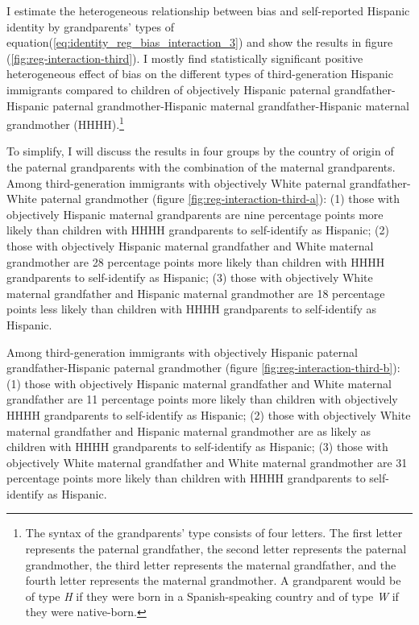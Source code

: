 \documentclass[12pt, fullpage]{article}
\begin{document}
I estimate the heterogeneous relationship between bias and self-reported Hispanic identity by grandparents' types of equation(\ref{eq:identity_reg_bias_interaction_3}) and show the results in figure (\ref{fig:reg-interaction-third}). I mostly find statistically significant positive heterogeneous effect of bias on the different types of third-generation Hispanic immigrants compared to children of objectively Hispanic paternal grandfather-Hispanic paternal grandmother-Hispanic maternal grandfather-Hispanic maternal grandmother (HHHH).\footnote{The syntax of the grandparents' type consists of four letters. The first letter represents the paternal grandfather, the second letter represents the paternal grandmother, the third letter represents the maternal grandfather, and the fourth letter represents the maternal grandmother. A grandparent would be of type \textit{H} if they were born in a Spanish-speaking country and of type \textit{W} if they were native-born.} 

To simplify, I will discuss the results in four groups by the country of origin of the paternal grandparents with the combination of the maternal grandparents. Among third-generation immigrants with objectively White paternal grandfather-White paternal grandmother (figure \ref{fig:reg-interaction-third-a}): (1) those with objectively Hispanic maternal grandparents are nine percentage points more likely than children with HHHH grandparents to self-identify as Hispanic; (2) those with objectively Hispanic maternal grandfather and White maternal grandmother are 28 percentage points more likely than children with HHHH grandparents to self-identify as Hispanic; (3) those with objectively White maternal grandfather and Hispanic maternal grandmother are 18 percentage points less likely than children with HHHH grandparents to self-identify as Hispanic. 

Among third-generation immigrants with objectively Hispanic paternal grandfather-Hispanic paternal grandmother (figure \ref{fig:reg-interaction-third-b}): (1) those with objectively Hispanic maternal grandfather and White maternal grandfather are 11 percentage points more likely than children with objectively HHHH grandparents to self-identify as Hispanic; (2) those with objectively White maternal grandfather and Hispanic maternal grandmother are as likely as children with HHHH grandparents to self-identify as Hispanic; (3) those with objectively White maternal grandfather and White maternal grandmother are 31 percentage points more likely than children with HHHH grandparents to self-identify as Hispanic.
\end{document}
